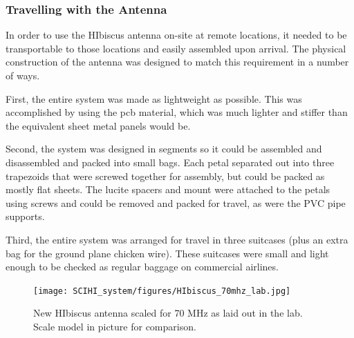 \subsubsection{Travelling with the Antenna}
In order to use the HIbiscus antenna on-site at remote locations, it needed to be transportable to those locations and easily assembled upon arrival. The physical construction of the antenna was designed to match this requirement in a number of ways. 

First, the entire system was made as lightweight as possible. This was accomplished by using the pcb material, which was much lighter and stiffer than the equivalent sheet metal panels would be. 

Second, the system was designed in segments so it could be assembled and disassembled and packed into small bags. Each petal separated out into three trapezoids that were screwed together for assembly, but could be packed as mostly flat sheets. The lucite spacers and mount were attached to the petals using screws and could be removed and packed for travel, as were the PVC pipe supports. 

Third, the entire system was arranged for travel in three suitcases (plus an extra bag for the ground plane chicken wire). These suitcases were small and light enough to be checked as regular baggage on commercial airlines. 

\begin{figure}[htb]
\begin{center}
\texttt{[image: SCIHI\_system/figures/HIbiscus\_70mhz\_lab.jpg]}
\caption{New HIbiscus antenna scaled for 70 MHz as laid out in the lab. Scale model in picture for comparison.}
\label{Fig:hibiscus_70}
\end{center}
\end{figure}


